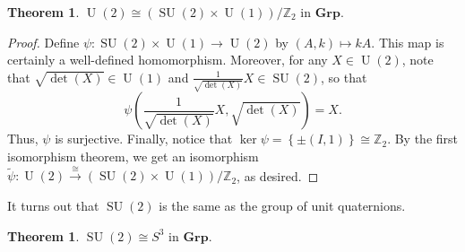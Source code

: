 \documentclass[10pt,letterpaper,cm]{nupset}
\theoremstyle{definition}
\theoremstyle{theorem}
\newtheorem{theorem}[definition]{Theorem}
\theoremstyle{remark}
\newcommand{\Z}{\mathbb Z}
\newcommand{\1}{\mathbf{1}}
\newcommand{\0}{\vec {0}}
\DeclareMathOperator{\SU}{SU}
\DeclareMathOperator{\U}{U}
\begin{document}
\begin{theorem}\label{u2iso}
 $\U(2)\cong \left(\SU(2)\times \U(1)\right)/\Z_2$ in $\mathbf{Grp}$.
\end{theorem}

\begin{proof}
Define  $\psi : \SU(2)\times \U(1)\to \U(2)$ by $\left(A, k\right)\mapsto kA$. This map is certainly a well-defined homomorphism. Moreover, for any $X\in \U(2)$, note that $\sqrt{\det(X)}\in \U(1)$ and $\frac{1}{\sqrt{\det(X)}}X\in \SU(2)$, so that $$\psi\left(\frac{1}{\sqrt{\det(X)}}X, \sqrt{\det(X)}\right)= X.$$ Thus, $\psi$ is surjective. Finally, notice that $\ker \psi=\left\{\pm(I, 1)\right\}\cong \Z_2$. By the first isomorphism theorem, we get an isomorphism $\tilde{\psi}: \U(2)\overset{\cong}{\longrightarrow} \left(\SU(2)\times \U(1)\right)/\Z_2$, as desired. 

\end{proof}

It turns out that $\SU(2)$ is the same as the group of unit quaternions.

\begin{theorem}\label{iso1}
$\SU(2) \cong S^3$ in $\mathbf{Grp}$. 
\end{theorem}
\end{document}
